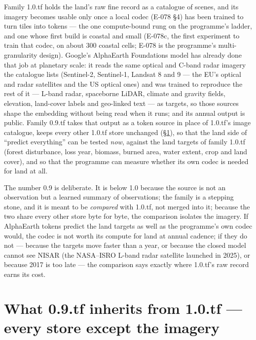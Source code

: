 \documentclass[10pt]{article}
\begin{document}
Family 1.0.tf holds the land's raw fine record as a catalogue of scenes, and
its imagery becomes usable only once a local codec (E-078 \S4) has been
trained to turn tiles into tokens --- the one compute-bound rung on the
programme's ladder, and one whose first build is coastal and small
(E-078c, the first experiment to train that codec, on about 300 coastal cells; E-078 is the programme's multi-granularity design). Google's AlphaEarth Foundations model has already done that job
at planetary scale: it reads the same optical and C-band radar imagery the
catalogue lists (Sentinel-2, Sentinel-1, Landsat 8 and 9 --- the EU's optical and radar satellites and the US optical ones) and was trained
to reproduce the rest of it --- L-band radar, spaceborne LiDAR, climate and
gravity fields, elevation, land-cover labels and geo-linked text --- as
targets, so those sources shape the embedding without being read when it
runs; and its annual output is public. Family 0.9.tf takes that output as
a token source in place of 1.0.tf's image catalogue, keeps every other 1.0.tf store unchanged (\S\ref{sec:inherits}), so that the land side of ``predict everything'' can be
tested \emph{now}, against the land targets of family 1.0.tf (forest
disturbance, loss year, biomass, burned area, water extent, crop and land
cover), and so that the programme can measure whether its own codec is
needed for land at all.

The number 0.9 is deliberate. It is below 1.0 because the source is not an
observation but a learned summary of observations; the family is a
stepping stone, and it is meant to be \emph{compared} with 1.0.tf, not
merged into it; because the two share every other store byte for byte, the comparison isolates the imagery. If AlphaEarth tokens predict the land targets as well as the
programme's own codec would, the codec is not worth its compute for land at
annual cadence; if they do not --- because the targets move faster than a
year, or because the closed model cannot see NISAR (the NASA--ISRO L-band radar satellite launched in 2025), or because 2017 is too
late --- the comparison says exactly where 1.0.tf's raw record earns its
cost.

\section{What 0.9.tf inherits from 1.0.tf --- every store except the imagery}
\label{sec:inherits}
\end{document}
